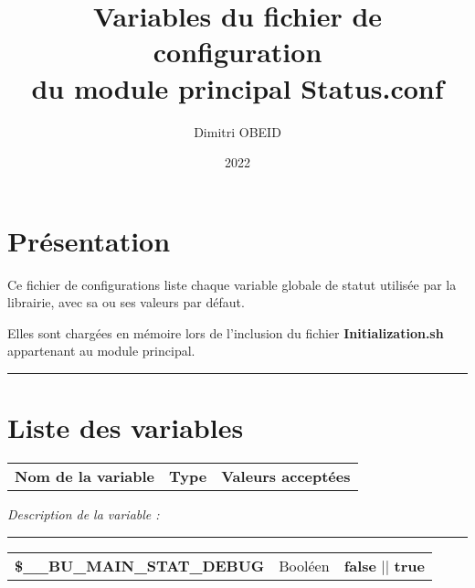 \documentclass[a4paper,10pt]{article}
\title{\color{sec1}Variables du fichier de configuration \\du module principal \color{path}Status.conf}\color{text}
\author{Dimitri OBEID}
\date{2022}
\begin{document}
\maketitle
\newpage

\hypertarget{contents}{}
\tableofcontents
\newpage

\color{sec1}
\section{Présentation}\color{text}

\begin{justify}
    Ce fichier de configurations liste chaque variable globale de statut utilisée par la librairie, avec sa ou ses valeurs par défaut.
\end{justify}

\begin{justify}
    Elles sont chargées en mémoire lors de l'inclusion du fichier \textbf{\color{path}Initialization.sh} appartenant au module principal.
\end{justify}




\color{sec1}\par\noindent\rule{\textwidth}{0.4pt}\color{text}

\color{sec1}
\section{Liste des variables}\color{text}

\begin{justify}
    \begin{tabular}{l|l|l}
        \textbf{Nom de la variable} & \textbf{Type} & \textbf{Valeurs acceptées}
    \end{tabular}
\end{justify}

\begin{justify}
    \textit{Description de la variable :}
\end{justify}


\par\noindent\rule{\textwidth}{0.4pt}

\begin{justify}
    \begin{tabular}{l|l|l}
        \textbf{\color{vars}\$\_\_BU\_MAIN\_STAT\_DEBUG}  & Booléen & \textbf{false} || \textbf{true} \\[1\baselineskip]
    \end{tabular}
\end{justify}
\end{document}

